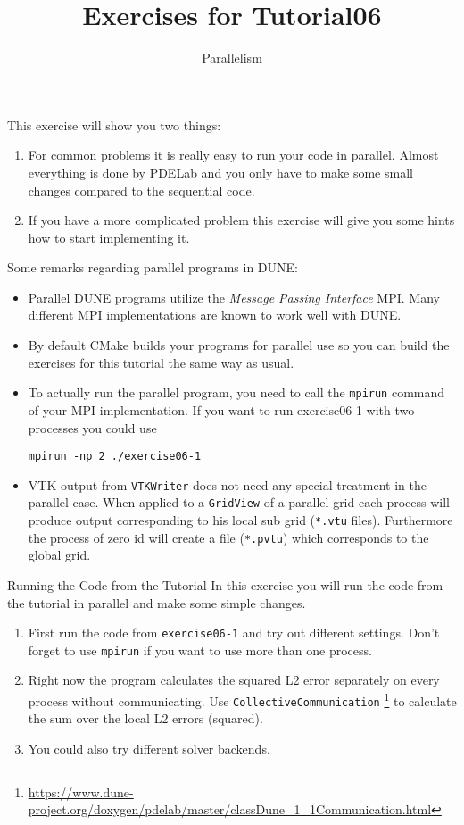 \documentclass[12pt,a4paper]{article}
\title{\textbf{Exercises for Tutorial06}}
\subtitle{Parallelism}
\begin{document}
\exerciseheader

This exercise will show you two things:
\begin{enumerate}
\item For common problems it is really easy to run your code in
  parallel. Almost everything is done by PDELab and you only have to make
  some small changes compared to the sequential code.
\item If you have a more complicated problem this exercise will give
  you some hints how to start implementing it.
\end{enumerate}

Some remarks regarding parallel programs in DUNE:
\begin{itemize}
\item Parallel DUNE programs utilize the \emph{Message Passing
    Interface} MPI. Many different MPI implementations are known to
  work well with DUNE.
\item By default CMake builds your programs for parallel use so you
  can build the exercises for this tutorial the same way as usual.
\item To actually run the parallel program, you need to call the
  \lstinline{mpirun} command of your MPI implementation. If you want
  to run exercise06-1 with two processes you could use
  \begin{lstlisting}
mpirun -np 2 ./exercise06-1
  \end{lstlisting}
\item VTK output from \lstinline{VTKWriter} does not need any special
  treatment in the parallel case. When applied to a
  \lstinline{GridView} of a parallel grid each process will produce
  output corresponding to his local sub grid (\lstinline{*.vtu}
  files).  Furthermore the process of zero id will create a file
  (\lstinline{*.pvtu}) which corresponds to the global grid.
\end{itemize}

\begin{Exercise}{Running the Code from the Tutorial}
  In this exercise you will run the code from the tutorial in parallel
  and make some simple changes.
  \begin{enumerate}
  \item First run the code from \lstinline{exercise06-1} and try out
    different settings. Don't forget to use \lstinline{mpirun} if you
    want to use more than one process.
  \item Right now the program calculates the squared L2 error separately on
    every process without communicating. Use
    \lstinline{CollectiveCommunication}
    \footnote{\url{https://www.dune-project.org/doxygen/pdelab/master/classDune_1_1Communication.html}}
    to calculate the sum over the local L2 errors (squared).
  \item You could also try different solver backends.
  \end{enumerate}
\end{Exercise}
\end{document}
